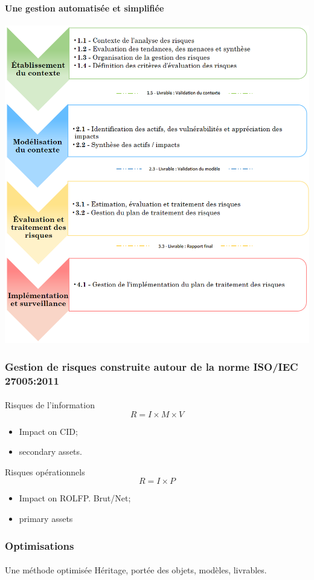 \begin{frame}
    \frametitle{}
    \framesubtitle{Une gestion automatisée et simplifiée}
    \begin{center}
        \includegraphics[scale=0.5]{./images/MONARC-method-2.png}
    \end{center}
\end{frame}


\begin{frame}
    \frametitle{Gestion de risques construite autour de la norme ISO/IEC 27005:2011}
    \framesubtitle{}
    \begin{block}{Risques de l’information}
        $$R = I \times M \times V$$
        \begin{itemize}
            \item Impact on CID;
            \item secondary assets.
        \end{itemize}
    \end{block}


    \begin{block}{Risques opérationnels}
        $$R = I \times P$$
        \begin{itemize}
            \item Impact on ROLFP. Brut/Net;
            \item primary assets
        \end{itemize}
    \end{block}
\end{frame}


\begin{frame}
    \frametitle{Optimisations}
    \framesubtitle{}
    \begin{block}{Une méthode optimisée}
    Héritage, portée des objets, modèles, livrables.
    \end{block}
\end{frame}
